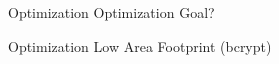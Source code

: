 \begin{frame}{Optimization}
	\center \Huge
	Optimization Goal?
\end{frame}

\begin{frame}{Optimization}
	\center \Huge
	Low Area Footprint (bcrypt)

\end{frame}



